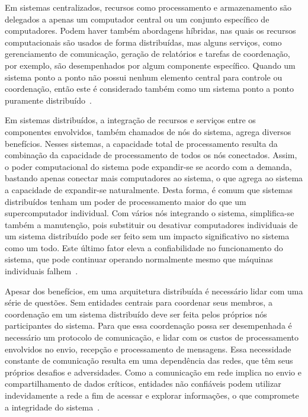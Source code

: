Em sistemas centralizados, recursos como processamento e armazenamento são delegados a apenas um computador central ou um conjunto específico de computadores. Podem haver também abordagens híbridas, nas quais os recursos computacionais são usados de forma distribuídas, mas alguns serviços, como gerenciamento de comunicação, geração de relatórios e tarefas de coordenação, por exemplo, são desempenhados por algum componente específico. Quando um sistema ponto a ponto não possui nenhum elemento central para controle ou coordenação, então este é considerado também como um sistema ponto a ponto puramente distribuído~\cite{tanembaum2007sistemas}.

Em sistemas distribuídos, a integração de recursos e serviços entre os componentes envolvidos, também chamados de nós do sistema, agrega diversos benefícios. Nesses sistemas, a capacidade total de processamento resulta da combinação da capacidade de processamento de todos os nós conectados. Assim, o poder computacional do sistema pode expandir-se se acordo com a demanda, bastando apenas conectar mais computadores ao sistema, o que agrega ao sistema a capacidade de expandir-se naturalmente. Desta forma, é comum que sistemas distribuídos tenham um poder de processamento maior do que um supercomputador individual. Com vários nós integrando o sistema, simplifica-se também a manutenção, pois substituir ou desativar computadores individuais de um sistema distribuído pode ser feito sem um impacto significativo no sistema como um todo. Este último fator eleva a confiabilidade no funcionamento do sistema, que pode continuar operando normalmente mesmo que máquinas individuais falhem~\cite{tanembaum2007sistemas, overview-blockchainbasic2018drescher}.

Apesar dos benefícios, em uma arquitetura distribuída é necessário lidar com uma série de questões. Sem entidades centrais para coordenar seus membros, a coordenação em um sistema distribuído deve ser feita pelos próprios nós participantes do sistema. Para que essa coordenação possa ser desempenhada é necessário um protocolo de comunicação, e lidar com os custos de processamento envolvidos no envio, recepção e processamento de mensagens. Essa necessidade constante de comunicação resulta em uma dependência das redes, que têm seus próprios desafios e adversidades. Como a comunicação em rede implica no envio e compartilhamento de dados críticos, entidades não confiáveis podem utilizar indevidamente a rede a fim de acessar e explorar informações, o que compromete a integridade do sistema~\cite{tanembaum2007sistemas, overview-blockchainbasic2018drescher}.

